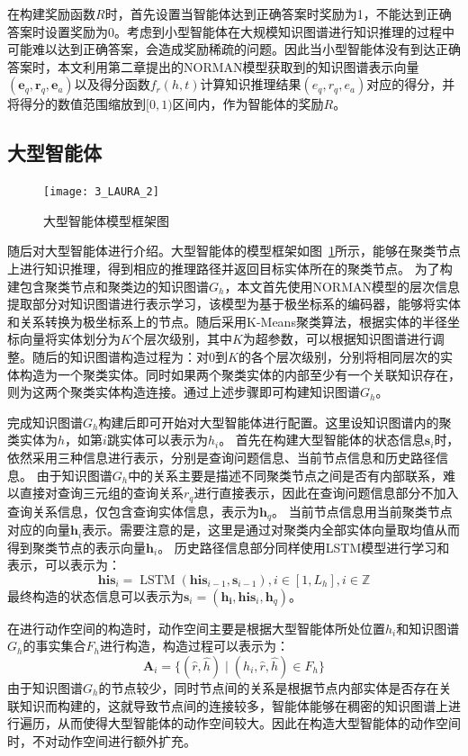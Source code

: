 \documentclass[algorithmlist, AutoFakeBold, AutoFakeSlant, figurelist, tablelist, nomlist, engineering]{seuthesix}
\begin{document}
在构建奖励函数$R$时，首先设置当智能体达到正确答案时奖励为1，不能达到正确答案时设置奖励为0。考虑到小型智能体在大规模知识图谱进行知识推理的过程中可能难以达到正确答案，会造成奖励稀疏的问题。因此当小型智能体没有到达正确答案时，本文利用第二章提出的NORMAN模型获取到的知识图谱表示向量$(\bm{e}_q, \bm{r}_q, \bm{e}_a)$以及得分函数$f_r(h, t)$计算知识推理结果$(e_q, r_q, e_a)$对应的得分，并将得分的数值范围缩放到$[0, 1)$区间内，作为智能体的奖励$R$。

\subsection{大型智能体}
\begin{figure}
  \centering
  \texttt{[image: 3\_LAURA\_2]}
  \caption{大型智能体模型框架图}
  \label{3_LAURA_2}
\end{figure}
随后对大型智能体进行介绍。大型智能体的模型框架如图~\ref{3_LAURA_2}所示，能够在聚类节点上进行知识推理，得到相应的推理路径并返回目标实体所在的聚类节点。
为了构建包含聚类节点和聚类边的知识图谱$G_h$，本文首先使用NORMAN模型的层次信息提取部分对知识图谱进行表示学习，该模型为基于极坐标系的编码器，能够将实体和关系转换为极坐标系上的节点。随后采用K-Means聚类算法，根据实体的半径坐标向量将实体划分为$K$个层次级别，其中$K$为超参数，可以根据知识图谱进行调整。随后的知识图谱构造过程为：对0到$K$的各个层次级别，分别将相同层次的实体构造为一个聚类实体。同时如果两个聚类实体的内部至少有一个关联知识存在，则为这两个聚类实体构造连接。通过上述步骤即可构建知识图谱$G_h$。

完成知识图谱$G_h$构建后即可开始对大型智能体进行配置。这里设知识图谱内的聚类实体为$h$，如第$i$跳实体可以表示为$h_i$。
首先在构建大型智能体的状态信息$\bm{s}_i$时，依然采用三种信息进行表示，分别是查询问题信息、当前节点信息和历史路径信息。
由于知识图谱$G_h$中的关系主要是描述不同聚类节点之间是否有内部联系，难以直接对查询三元组的查询关系$r_q$进行直接表示，因此在查询问题信息部分不加入查询关系信息，仅包含查询实体信息，表示为$\bm{h}_q$。
当前节点信息用当前聚类节点对应的向量$\bm{h}_i$表示。需要注意的是，这里是通过对聚类内全部实体向量取均值从而得到聚类节点的表示向量$\bm{h}_i$。
历史路径信息部分同样使用LSTM模型进行学习和表示，可以表示为：
\begin{equation}
  \bm{his}_i=\operatorname{LSTM}\left(\bm{his}_{i - 1}, \bm{s}_{i - 1}\right), i \in [1, L_h], i \in \mathbb{Z}
\end{equation}
最终构造的状态信息可以表示为$\bm{s}_i = (\bm{h_i}, \bm{his}_i, \bm{h}_q)$。

在进行动作空间的构造时，动作空间主要是根据大型智能体所处位置$h_i$和知识图谱$G_h$的事实集合$F_h$进行构造，构造过程可以表示为：
\begin{equation}
  \bm{A}_i = \{(\hat{r}, \hat{h}) \mid (h_i, \hat{r}, \hat{h}) \in F_h\}
  \label{base_2}
\end{equation}
由于知识图谱$G_h$的节点较少，同时节点间的关系是根据节点内部实体是否存在关联知识而构建的，这就导致节点间的连接较多，智能体能够在稠密的知识图谱上进行遍历，从而使得大型智能体的动作空间较大。因此在构造大型智能体的动作空间时，不对动作空间进行额外扩充。
\end{document}
